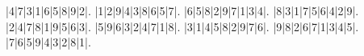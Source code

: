 \begin{sudoku}
|4|7|3|1|6|5|8|9|2|.
|1|2|9|4|3|8|6|5|7|.
|6|5|8|2|9|7|1|3|4|.
|8|3|1|7|5|6|4|2|9|.
|2|4|7|8|1|9|5|6|3|.
|5|9|6|3|2|4|7|1|8|.
|3|1|4|5|8|2|9|7|6|.
|9|8|2|6|7|1|3|4|5|.
|7|6|5|9|4|3|2|8|1|.
\end{sudoku}